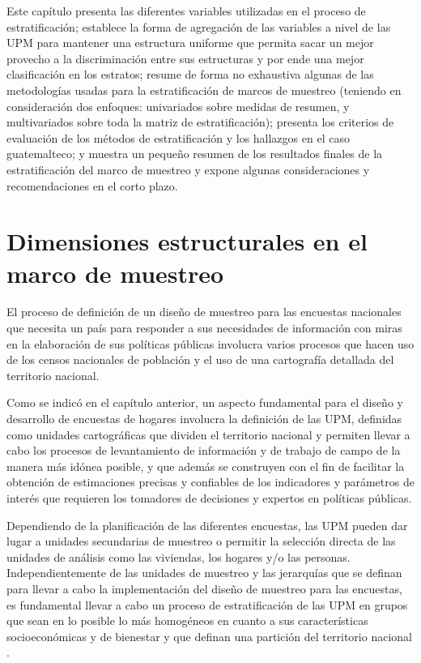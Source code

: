 \documentclass[
  10pt,
  spanish,
]{book}
\begin{document}
Este capítulo presenta las diferentes variables utilizadas en el proceso de estratificación; establece la forma de agregación de las variables a nivel de las UPM para mantener una estructura uniforme que permita sacar un mejor provecho a la discriminación entre sus estructuras y por ende una mejor clasificación en los estratos; resume de forma no exhaustiva algunas de las metodologías usadas para la estratificación de marcos de muestreo (teniendo en consideración dos enfoques: univariados sobre medidas de resumen, y multivariados sobre toda la matriz de estratificación); presenta los criterios de evaluación de los métodos de estratificación y los hallazgos en el caso guatemalteco; y muestra un pequeño resumen de los resultados finales de la estratificación del marco de muestreo y expone algunas consideraciones y recomendaciones en el corto plazo.

\hypertarget{dimensiones-estructurales-en-el-marco-de-muestreo}{%
\section{Dimensiones estructurales en el marco de muestreo}\label{dimensiones-estructurales-en-el-marco-de-muestreo}}

El proceso de definición de un diseño de muestreo para las encuestas nacionales que necesita un país para responder a sus necesidades de información con miras en la elaboración de sus políticas públicas involucra varios procesos que hacen uso de los censos nacionales de población y el uso de una cartografía detallada del territorio nacional.

Como se indicó en el capítulo anterior, un aspecto fundamental para el diseño y desarrollo de encuestas de hogares involucra la definición de las UPM, definidas como unidades cartográficas que dividen el territorio nacional y permiten llevar a cabo los procesos de levantamiento de información y de trabajo de campo de la manera más idónea posible, y que además se construyen con el fin de facilitar la obtención de estimaciones precisas y confiables de los indicadores y parámetros de interés que requieren los tomadores de decisiones y expertos en políticas públicas.

Dependiendo de la planificación de las diferentes encuestas, las UPM pueden dar lugar a unidades secundarias de muestreo o permitir la selección directa de las unidades de análisis como las viviendas, los hogares y/o las personas. Independientemente de las unidades de muestreo y las jerarquías que se definan para llevar a cabo la implementación del diseño de muestreo para las encuestas, es fundamental llevar a cabo un proceso de estratificación de las UPM en grupos que sean en lo posible lo más homogéneos en cuanto a sus características socioeconómicas y de bienestar y que definan una partición del territorio nacional \citep{Gutierrez_2016}.
\end{document}
